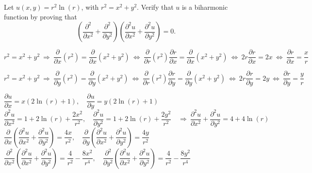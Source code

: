 \begin{Exercise}[difficulty = 3]
Let $u(x,y)=r^2 \ln (r)$, with $r^2 = x^2 + y^2$. Verify that $u$ is a biharmonic function by proving that
\[  \left( \dfrac{\partial^2 }{\partial x^2} + \dfrac{\partial^2 }{\partial y^2} \right) \left(  \dfrac{\partial^2 u}{\partial x^2} + \dfrac{\partial^2 u}{\partial y^2} \right) = 0.\]
\end{Exercise}

\begin{Answer}

    $r^2 = x^2 + y^2 \  \Rightarrow \ \dfrac{\partial}{\partial x}\left(r^2\right) = \dfrac{\partial}{\partial x}\left(x^2+y^2\right) \ \Leftrightarrow \   \dfrac{\partial}{\partial r}\left(r^2\right)\dfrac{\partial r}{\partial x} = \dfrac{\partial}{\partial x}\left(x^2+y^2\right)  \ \Leftrightarrow \  2r\dfrac{\partial r}{\partial x} = 2x \  \Leftrightarrow \  \dfrac{\partial r}{\partial x} = \dfrac{x}{r} $
    
    
    $r^2 = x^2 + y^2 \  \Rightarrow \ \dfrac{\partial}{\partial y}\left(r^2\right) = \dfrac{\partial}{\partial y}\left(x^2+y^2\right) \ \Leftrightarrow \   \dfrac{\partial}{\partial r}\left(r^2\right)\dfrac{\partial r}{\partial y} = \dfrac{\partial}{\partial y}\left(x^2+y^2\right)  \ \Leftrightarrow \  2r\dfrac{\partial r}{\partial y} = 2y \  \Leftrightarrow \  \dfrac{\partial r}{\partial y} = \dfrac{y}{r} $



    $\dfrac{\partial u}{ \partial x} = x(2\ln (r) + 1), \quad \dfrac{\partial u}{ \partial y} = y(2\ln (r) + 1) $ \\[0.2cm]
     $\dfrac{\partial^2 u}{ \partial x^2} = 1 + 2 \ln (r) + \dfrac{2x^2}{r^2}, \quad \dfrac{\partial^2 u}{ \partial y^2} = 1 + 2 \ln (r) + \dfrac{2y^2}{r^2} \quad\Rightarrow \ \dfrac{\partial^2 u}{ \partial x^2} + \dfrac{\partial^2 u}{ \partial y^2}= 4 + 4\ln (r)$ \\[0.2cm]
    $\dfrac{\partial}{ \partial x}\left(\dfrac{\partial^2 u}{ \partial x^2} + \dfrac{\partial^2 u}{ \partial y^2} \right)= \dfrac{4x}{r^2}, \quad \dfrac{\partial}{ \partial y}\left(\dfrac{\partial^2 u}{ \partial x^2} + \dfrac{\partial^2 u}{ \partial y^2} \right)= \dfrac{4y}{r^2}$\\[0.2cm]
     $\dfrac{\partial^2}{ \partial x^2}\left(\dfrac{\partial^2 u}{ \partial x^2} + \dfrac{\partial^2 u}{ \partial y^2} \right)= \dfrac{4}{r^2} - \dfrac{8x^2}{r^4}, \quad \dfrac{\partial^2}{ \partial y^2}\left(\dfrac{\partial^2 u}{ \partial x^2} + \dfrac{\partial^2 u}{ \partial y^2} \right)= \dfrac{4}{r^2} - \dfrac{8y^2}{r^4}$
\end{Answer}

